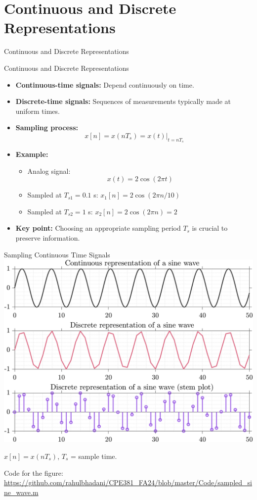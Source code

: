 \documentclass[aspectratio=169,xcolor=dvipsnames,svgnames,x11names,fleqn]{beamer}
\begin{document}
\section{Continuous and Discrete Representations}

\begin{frame}{}
    \begin{center}
    \Huge \bf \color{DarkBlue}
    \faFire
    
Continuous and Discrete Representations
\end{center}
\end{frame}

\begin{frame}{Continuous and Discrete Representations}
    \begin{itemize}
        \item \textbf{Continuous-time signals:} Depend continuously on time.
        \item \textbf{Discrete-time signals:} Sequences of measurements typically made at uniform times.
        \item \textbf{Sampling process:} 
        \begin{equation*}
            x[n] = x(nT_s) = x(t)|_{t=nT_s}
        \end{equation*}
        \item \textbf{Example:} 
        \begin{itemize}
            \item Analog signal: $$ x(t) = 2 \cos(2\pi t) $$
            \item Sampled at $ T_{s1} = 0.1 $ s: $ x_1[n] = 2 \cos(2\pi n/10) $
            \item Sampled at $ T_{s2} = 1 $ s: $ x_2[n] = 2 \cos(2\pi n) = 2 $
        \end{itemize}
        \item \textbf{Key point:} Choosing an appropriate sampling period \( T_s \) is crucial to preserve information.
    \end{itemize}
\end{frame}
\begin{frame}{Sampling Continuous Time Signals}
    \centering
    \includegraphics[width=0.45\linewidth, trim=0 0 0 0cm,clip]{figures/sampled_sine_wave.png} 
    
    $x[n] = x(nT_s)$,
$T_s$ = sample time.
    
    \tiny
    Code for the figure: \url{https://github.com/rahulbhadani/CPE381_FA24/blob/master/Code/sampled_sine_wave.m}
\end{frame}
\end{document}
